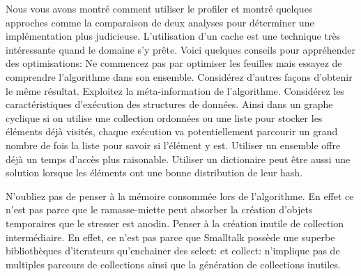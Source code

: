 \documentclass[a4paper,10pt,twoside]{book}
\begin{document}
Nous vous avons montr\'e comment utiliser le profiler et montr\'e
quelques approches comme la comparaison de deux analyses pour
d\'eterminer une impl\'ementation plus judicieuse. L'utilisation d'un
cache est une technique tr\`es int\'eressante quand le domaine s'y
pr\^ete. Voici quelques conseils pour appr\'ehender des optimisations:
Ne commencez pas par optimiser les feuilles mais essayez de comprendre
l'algorithme dans son ensemble. Consid\'erez d'autres fa\c cons
d'obtenir le m\^eme r\'esultat.  Exploitez la m\'eta-information de
l'algorithme.
Consid\'erez les caract\'eristiques d'ex\'ecution des structures de
donn\'ees. Ainsi dans un graphe cyclique si on utilise une
collection ordonn\'ees ou une liste pour stocker les \'el\'ements d\'ej\`a
visit\'es, chaque ex\'ecution va potentiellement parcourir un grand nombre de fois
la liste pour savoir si l'\'el\'ement y est. Utiliser un
ensemble offre d\'ej\`a un temps d'acc\`es plus raisonable. Utiliser
un dictionaire peut \^etre aussi une solution lorsque les \'el\'ements ont
une bonne distribution de leur hash. 

N'oubliez pas de penser \`a la m\'emoire consomm\'ee lors de
l'algorithme. En effet ce n'est pas parce que le ramasse-miette peut
absorber la cr\'eation d'objets temporaires que le stresser est
anodin. Penser \`a la cr\'eation inutile de collection
interm\'ediaire.  En effet, ce n'est pas parce que Smalltalk poss\`ede
une superbe biblioth\`eques d'iterateurs qu'enchainer des select: et
collect: n'implique pas de multiples parcours de collections
ainsi que la g\'en\'eration de collections inutiles. 



%
%




\ifx\wholebook\relax\else
\end{document}
